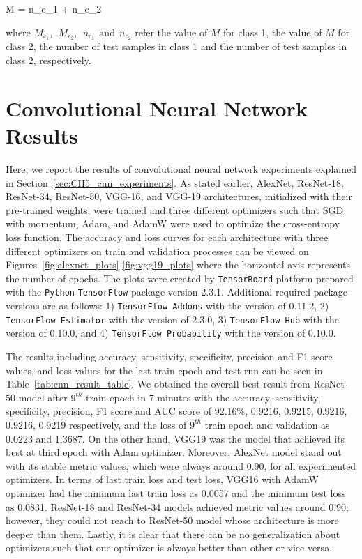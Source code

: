 \be
\label{eq:weighted_avg_binary_class_metric}
M =  {n_{c_{1}} + n_{c_{2}}} \:\: \raisepunct{,}
\ee

where $M_{c_{1}},\:\:M_{c_{2}},\:\:n_{c_{1}}\:\:\text{and}\:\:n_{c_{2}}$ refer the value of $M$ for class 1, the value of $M$ for class 2, the number of test samples in class 1 and the number of test samples in class 2, respectively.

\section{Convolutional Neural Network Results}

Here, we report the results of convolutional neural network experiments explained in Section~\ref{sec:CH5_cnn_experiments}. As stated earlier, AlexNet, ResNet-18, ResNet-34, ResNet-50, VGG-16, and VGG-19 architectures, initialized with their pre-trained weights, were trained and three different optimizers such that SGD with momentum, Adam, and AdamW were used to optimize the cross-entropy loss function. The accuracy and loss curves for each architecture with three different optimizers on train and validation processes can be viewed on Figures~\ref{fig:alexnet_plots}-\ref{fig:vgg19_plots} where the horizontal axis represents the number of epochs. The plots were created by \verb|TensorBoard| platform prepared with the \verb|Python| \verb|TensorFlow| package version 2.3.1. Additional required package versions are as follows: 1) \verb|TensorFlow Addons| with the version of 0.11.2, 2) \verb|TensorFlow Estimator| with the version of 2.3.0, 3) \verb|TensorFlow Hub| with the version of 0.10.0, and 4) \verb|TensorFlow Probability| with the version of 0.10.0.

The results including accuracy, sensitivity, specificity, precision and F1 score values, and loss values for the last train epoch and test run can be seen in Table~\ref{tab:cnn_result_table}. We obtained the overall best result from ResNet-50 model after $9^{th}$ train epoch in 7 minutes with the accuracy, sensitivity, specificity, precision, F1 score and AUC score of 92.16\%, 0.9216, 0.9215, 0.9216, 0.9216, 0.9219 respectively, and the loss of $9^{th}$ train epoch and validation as 0.0223 and 1.3687. On the other hand, VGG19 was the model that achieved its best at third epoch with Adam optimizer. Moreover, AlexNet model stand out with its stable metric values, which were always around 0.90, for all experimented optimizers. In terms of last train loss and test loss, VGG16 with AdamW optimizer had the minimum last train loss as 0.0057 and the minimum test loss as 0.0831. ResNet-18 and ResNet-34 models achieved metric values around 0.90; however, they could not reach to ResNet-50 model whose architecture is more deeper than them. Lastly, it is clear that there can be no generalization about optimizers such that one optimizer is always better than other or vice versa.

